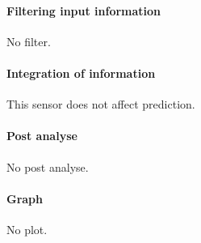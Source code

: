\paragraph{Filtering input information}

No filter.

\paragraph{Integration of information}

This sensor does not affect prediction.

\paragraph{Post analyse}

No post analyse.

\paragraph{Graph}

No plot.

